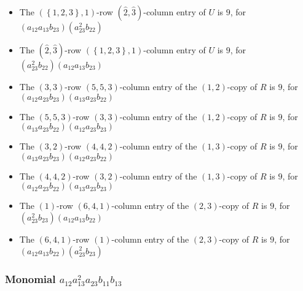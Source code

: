\documentclass{article}
\begin{document}
\begin{itemize}
\item The $ \left(\left\{1, 2, 3\right\}, 1\right) $-row $ (\hat{2}, \hat{3}) $-column entry of $U$ is $ 9 $, for $( a_{12} a_{13} b_{23} )( a_{23}^{2} b_{22} )$ 
\item The $(\hat{2}, \hat{3})$-row $ \left(\left\{1, 2, 3\right\}, 1\right) $-column entry of $U$ is $ 9 $, for $( a_{23}^{2} b_{22} )( a_{12} a_{13} b_{23} )$ 
\item The $(3, 3)$-row $(5, 5, 3)$-column entry of the $ \left(1, 2\right) $-copy of $R$ is $ 9 $, for $( a_{12} a_{23} b_{23} )( a_{13} a_{23} b_{22} )$ 
\item The $(5, 5, 3)$-row $(3, 3)$-column entry of the $ \left(1, 2\right) $-copy of $R$ is $ 9 $, for $( a_{13} a_{23} b_{22} )( a_{12} a_{23} b_{23} )$ 
\item The $(3, 2)$-row $(4, 4, 2)$-column entry of the $ \left(1, 3\right) $-copy of $R$ is $ 9 $, for $( a_{13} a_{23} b_{23} )( a_{12} a_{23} b_{22} )$ 
\item The $(4, 4, 2)$-row $(3, 2)$-column entry of the $ \left(1, 3\right) $-copy of $R$ is $ 9 $, for $( a_{12} a_{23} b_{22} )( a_{13} a_{23} b_{23} )$ 
\item The $(1)$-row $(6, 4, 1)$-column entry of the $ \left(2, 3\right) $-copy of $R$ is $ 9 $, for $( a_{23}^{2} b_{23} )( a_{12} a_{13} b_{22} )$ 
\item The $(6, 4, 1)$-row $(1)$-column entry of the $ \left(2, 3\right) $-copy of $R$ is $ 9 $, for $( a_{12} a_{13} b_{22} )( a_{23}^{2} b_{23} )$ 
\end{itemize}
\subsubsection{Monomial $ a_{12} a_{13}^{2} a_{23} b_{11} b_{13} $}
\end{document}

